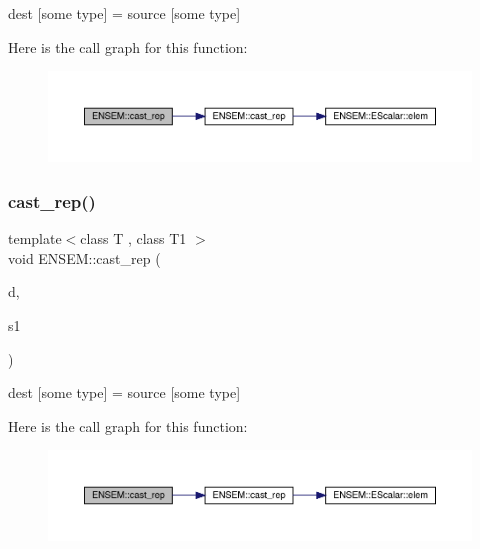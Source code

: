 dest \mbox{[}some type\mbox{]} = source \mbox{[}some type\mbox{]} 

Here is the call graph for this function\+:\nopagebreak
\begin{figure}[H]
\begin{center}
\leavevmode
\includegraphics[width=350pt]{d1/d71/group__obsscalar_gaf1b78a4937f88c01ae3300374d58d7f2_cgraph}
\end{center}
\end{figure}
\mbox{\label{group__obsscalar_gaa5f9d1572097c605caade566731fe99a}} 
\subsubsection{\texorpdfstring{cast\_rep()}{cast\_rep()}\hspace{0.1cm}{\footnotesize\ttfamily [2/2]}}
{\footnotesize\ttfamily template$<$class T , class T1 $>$ \\
void E\+N\+S\+E\+M\+::cast\+\_\+rep (\begin{DoxyParamCaption}\item[{\mbox{\hyperlink{classENSEM_1_1OScalar}{O\+Scalar}}$<$ T $>$ \&}]{d,  }\item[{const \mbox{\hyperlink{classENSEM_1_1OScalar}{O\+Scalar}}$<$ T1 $>$ \&}]{s1 }\end{DoxyParamCaption})\hspace{0.3cm}{\ttfamily [inline]}}



dest \mbox{[}some type\mbox{]} = source \mbox{[}some type\mbox{]} 

Here is the call graph for this function\+:\nopagebreak
\begin{figure}[H]
\begin{center}
\leavevmode
\includegraphics[width=350pt]{d1/d71/group__obsscalar_gaa5f9d1572097c605caade566731fe99a_cgraph}
\end{center}
\end{figure}
\mbox{\label{group__obsscalar_ga53162d32552af7a67c288bfa204dce7c}} 
